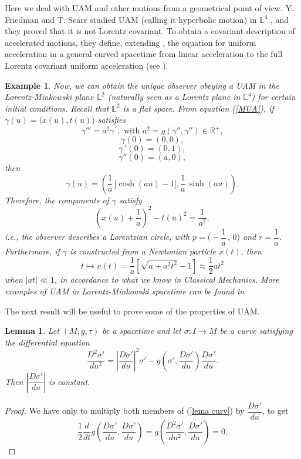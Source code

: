 \documentclass[11pt]{book}
\newtheorem{lem}[defi]{Lemma}
\newtheorem{ex}[defi]{Example}
\def\R{\mathbb R}
\def\L{\mathbb L}
\begin{document}
Here we deal with UAM and other motions from a geometrical point of view. Y. Friedman and T. Scarr studied UAM (calling it hyperbolic motion) in $\L^4$ \cite{Friedman1}, and they proved that it is not Lorentz covariant. To obtain a covariant description of accelerated motions, they define, extending \cite{UAM}, the equation for uniform acceleration in a general curved spacetime from linear acceleration to the full Lorentz covariant uniform acceleration (see \cite{Friedman2}).

\begin{ex}
	{\rm
		Now, we can obtain the unique observer obeying a UAM in the Lorentz-Minkowski plane $\L^2$ (naturally seen as a Lorentz plane in $\L^4$) for certain initial conditions. Recall that $\L^2$ is a flat space. From equation (\ref{MUA}), if $\gamma(u)=\big(x(u), t(u)\big)$ satisfies
		\[
		\gamma'''=a^2\gamma^{\, '}, \text{ with } a^2=g(\gamma'',\gamma'')\in \R^+, 
		\]
		\[
		\gamma(0)=(0,0), 
		\]
		\[
		\gamma{\,'}(0)=(0,1), 
		\]
		\[
		\gamma''(0)=(a,0), 
		\]
		then
		\[
		\gamma(u)=\left(\frac{1}{a}\, \big[\cosh(au) - 1\big], \frac{1}{a}\, \sinh(au)\right).
		\]
		Therefore, the components of $\gamma$ satisfy
		\[
		\left(x(u)+\frac{1}{a}\right)^2-t(u)^2=\frac{1}{a^2},
		\]
		i.e., the observer describes a Lorentzian circle, with $p=\Big(-\dfrac{1}{a}\,,\,0\Big)$ and $r=\dfrac{1}{a}$.
		\vspace{2mm}
		\\	
		Furthermore, if $\gamma$ is constructed from a Newtonian particle $x(t)$, then  
		\[
		t\longmapsto x(t)=\frac{1}{a} [\sqrt{a+a^2 t^2} - 1] \approx \frac{1}{2} at^2
		\]
		when $|at| \ll 1$, in accordance to what we know in Classical Mechanics. More examples of UAM in Lorentz-Minkowski spacetime can be found in \cite[Section 4.2]{Gron}}
\end{ex}

The next result will be useful to prove some of the properties of UAM.
\begin{lem}\label{lema curv 1}
	Let $(M,g,\tau)$ be a spacetime and let $\sigma:I\to M$ be a curve satisfying the differential equation
	\begin{equation}\label{lema curv}
		\frac{D^2\sigma'}{du^2}=\left|\frac{D\sigma'}{du}\right|^2\sigma'- g\left(\sigma',\frac{D\sigma'}{du}\right) \frac{D\sigma'}{du}.
	\end{equation}
	Then $\left|\dfrac{D\sigma'}{du}\right|$ is constant.
\end{lem}
\begin{proof}
	We have only to multiply both members of (\ref{lema curv}) by $\dfrac{D\sigma'}{du}$, to get
	\[
	\frac{1}{2} \frac{d}{dt}g\left(\frac{D\sigma'}{du},\frac{D\sigma'}{du}\right)= g\left(\frac{D^2\sigma'}{du^2},\frac{D\sigma'}{du}\right)=0.
	\]
\end{proof}
\end{document}

